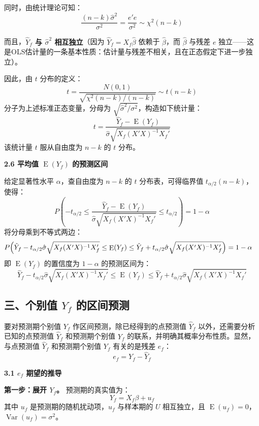 \documentclass[12pt,a4paper]{ctexart}
\DeclareMathOperator{\Var}{Var}
\DeclareMathOperator{\E}{E}
\begin{document}
同时，由统计理论可知：
\[
\frac{(n-k)\hat{\sigma}^2}{\sigma^2} = \frac{e'e}{\sigma^2} \sim \chi^2(n-k)
\]

而且，\textbf{$\hat{Y}_f$ 与 $\hat{\sigma}^2$ 相互独立}（因为 $\hat{Y}_f = X_f\hat{\beta}$ 依赖于 $\hat{\beta}$，而 $\hat{\beta}$ 与残差 $e$ 独立——这是OLS估计量的一条基本性质：估计量与残差不相关，且在正态假定下进一步独立）。

因此，由 $t$ 分布的定义：
\[
t = \frac{N(0,1)}{\sqrt{\chi^2(n-k)/(n-k)}} \sim t(n-k)
\]
分子为上述标准正态变量，分母为 $\sqrt{\hat{\sigma}^2/\sigma^2}$，构造如下统计量：
\begin{equation}
t = \frac{\hat{Y}_f - \E(Y_f)}{\hat{\sigma}\sqrt{X_f(X'X)^{-1}X_f'}} \tag{3.60}
\end{equation}
该统计量 $t$ 服从自由度为 $n-k$ 的 $t$ 分布。

\textbf{2.6 平均值 $\E(Y_f)$ 的预测区间}

给定显著性水平 $\alpha$，查自由度为 $n-k$ 的 $t$ 分布表，可得临界值 $t_{\alpha/2}(n-k)$，使得：
\[
P\left(-t_{\alpha/2} \leq \frac{\hat{Y}_f - \E(Y_f)}{\hat{\sigma}\sqrt{X_f(X'X)^{-1}X_f'}} \leq t_{\alpha/2}\right) = 1-\alpha
\]
将分母乘到不等式两边：
\begin{align}
&P\Bigl(\hat{Y}_f - t_{\alpha/2}\hat{\sigma}\sqrt{X_f(X'X)^{-1}X_f'} \leq \E(Y_f) \leq \hat{Y}_f + t_{\alpha/2}\hat{\sigma}\sqrt{X_f(X'X)^{-1}X_f'}\Bigr) = 1-\alpha \notag
\end{align}
即 $\E(Y_f)$ 的置信度为 $1-\alpha$ 的预测区间为：
\begin{equation}
\hat{Y}_f - t_{\alpha/2}\hat{\sigma}\sqrt{X_f(X'X)^{-1}X_f'} \leq \E(Y_f) \leq \hat{Y}_f + t_{\alpha/2}\hat{\sigma}\sqrt{X_f(X'X)^{-1}X_f'} \tag{3.61}
\end{equation}

\subsection{三、个别值 \texorpdfstring{$Y_f$}{Yf} 的区间预测}

要对预测期个别值 $Y_f$ 作区间预测，除已经得到的点预测值 $\hat{Y}_f$ 以外，还需要分析已知的点预测值 $\hat{Y}_f$ 和预测期个别值 $Y_f$ 的联系，并明确其概率分布性质。显然，与点预测值 $\hat{Y}_f$ 和预测期个别值 $Y_f$ 有关的是残差 $e_f$：
\begin{equation}
e_f = Y_f - \hat{Y}_f \tag{3.62}
\end{equation}

\textbf{3.1 $e_f$ 期望的推导}

\noindent\textbf{第一步：展开 $Y_f$。}
预测期的真实值为：
\[
Y_f = X_f\beta + u_f
\]
其中 $u_f$ 是预测期的随机扰动项，$u_f$ 与样本期的 $U$ 相互独立，且 $\E(u_f)=0$，$\Var(u_f)=\sigma^2$。
\end{document}
